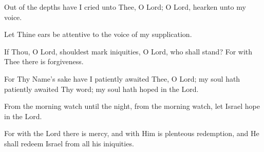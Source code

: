 Out of the depths have I cried unto Thee, O Lord; O Lord, hearken unto my voice.

Let Thine ears be attentive to the voice of my supplication.

If Thou, O Lord, shouldest mark iniquities, O Lord, who shall stand? For with Thee there is forgiveness.

For Thy Name's sake have I patiently awaited Thee, O Lord; my soul hath patiently awaited Thy word; my soul hath hoped in the Lord.

From the morning watch until the night, from the morning watch, let Israel hope in the Lord.

For with the Lord there is mercy, and with Him is plenteous redemption, and He shall redeem Israel from all his iniquities.
